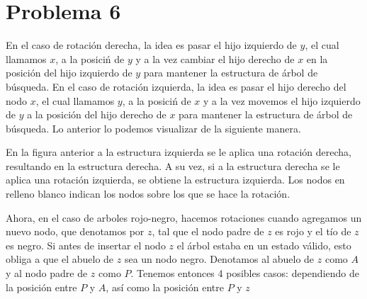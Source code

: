 \documentclass[10pt,a4paper]{article}
\begin{document}
\section*{Problema 6}
En el caso de rotaci\'on derecha, la idea es pasar el hijo izquierdo de $y$, el cual llamamos $x$, a la posici\'n de $y$ y a la vez cambiar el hijo derecho de $x$ en la posici\'on del hijo izquierdo de $y$ para mantener la estructura de \'arbol de b\'usqueda. En el caso de rotaci\'on izquierda, la idea es pasar el hijo derecho del nodo $x$, el cual llamamos $y$, a la posici\'n de $x$ y a la vez movemos el hijo izquierdo de $y$ a la posici\'on del hijo derecho de $x$ para mantener la estructura de \'arbol de b\'usqueda. Lo anterior lo podemos visualizar de la siguiente manera.\newline

\hspace{1.5cm}
\hspace{1cm}

En la figura anterior a la estructura izquierda se le aplica una rotaci\'on derecha, resultando en la estructura derecha. A su vez, si a la estructura derecha se le aplica una rotaci\'on izquierda, se obtiene la estructura izquierda. Los nodos en relleno blanco indican los nodos sobre los que se hace la rotaci\'on.\newline

Ahora, en el caso de arboles rojo-negro, hacemos rotaciones cuando agregamos un nuevo nodo, que denotamos por $z$, tal que el nodo padre de $z$ es rojo y el t\'io de $z$ es negro. Si antes de insertar el nodo $z$ el \'arbol estaba en un estado v\'alido, esto obliga a que el abuelo de $z$ sea un nodo negro. Denotamos al abuelo de $z$ como $A$ y al nodo padre de $z$ como $P$. Tenemos entonces 4 posibles casos: dependiendo de la posici\'on entre $P$ y $A$, as\'i como la posici\'on entre $P$ y $z$
\end{document}
